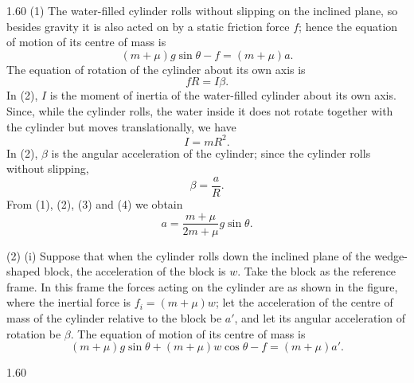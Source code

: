 \begin{solution}{1.60}
(1) The water-filled cylinder rolls without slipping on the inclined plane, so besides gravity it is also acted on by a static friction force $f$; hence the equation of motion of its centre of mass is
\begin{equation}
(m+\mu)g\sin\theta-f=(m+\mu)a. \tag{1}
\end{equation}
The equation of rotation of the cylinder about its own axis is
\begin{equation}
fR=I\beta. \tag{2}
\end{equation}
In (2), $I$ is the moment of inertia of the water-filled cylinder about its own axis. Since, while the cylinder rolls, the water inside it does not rotate together with the cylinder but moves translationally, we have
\begin{equation}
I=mR^2. \tag{3}
\end{equation}
In (2), $\beta$ is the angular acceleration of the cylinder; since the cylinder rolls without slipping,
\begin{equation}
\beta=\frac{a}{R}. \tag{4}
\end{equation}
From (1), (2), (3) and (4) we obtain
\[
a=\frac{m+\mu}{2m+\mu}g\sin\theta.
\]

(2) (i) Suppose that when the cylinder rolls down the inclined plane of the wedge-shaped block, the acceleration of the block is $w$. Take the block as the reference frame. In this frame the forces acting on the cylinder are as shown in the figure, where the inertial force is $f_i=(m+\mu)w$; let the acceleration of the centre of mass of the cylinder relative to the block be $a'$, and let its angular acceleration of rotation be $\beta$. The equation of motion of its centre of mass is
\begin{equation}
(m+\mu)g\sin\theta+(m+\mu)w\cos\theta-f=(m+\mu)a'. \tag{5}
\end{equation}

\begin{figbox}{1.60}
\end{figbox}


\end{solution}
